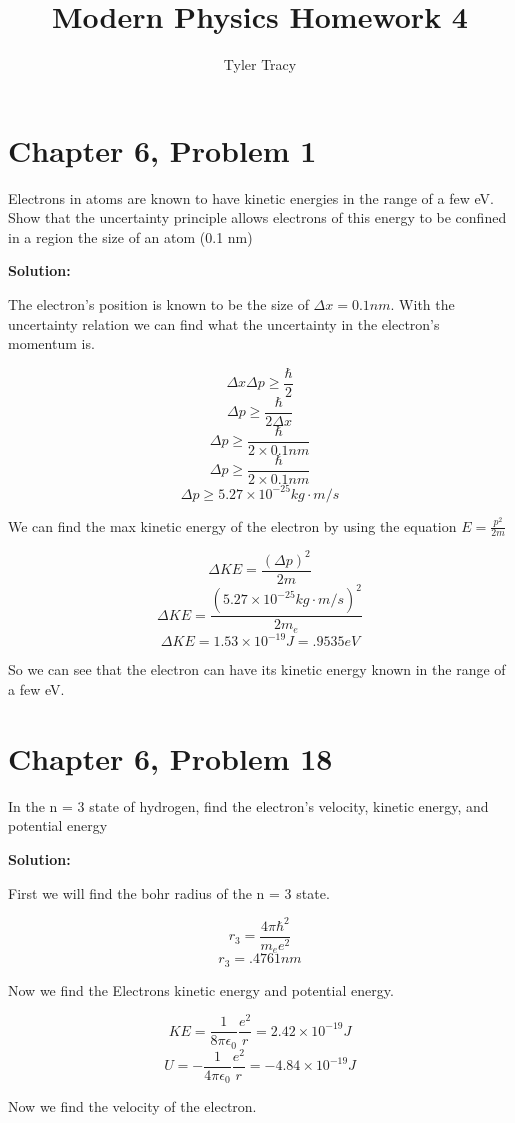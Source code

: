 \documentclass{article}
\title{Modern Physics Homework 4}
\author{Tyler Tracy}
\begin{document}
\maketitle


\section{Chapter 6, Problem 1}

Electrons in atoms are known to have kinetic energies in the range of a few eV. Show that the uncertainty principle allows electrons of this energy to be confined in a region the size of an atom (0.1 nm)


\textbf{Solution:}

The electron's position is known to be the size of $ \Delta x = 0.1 nm $. With the uncertainty relation we can find what the uncertainty in the electron's momentum is.

$$\Delta x \Delta p \geq \frac{\hbar}{2}$$
$$ \Delta p \geq \frac{\hbar}{2 \Delta x}$$
$$ \Delta p \geq \frac{\hbar}{2 \times 0.1 nm}$$
$$ \Delta p \geq \frac{\hbar}{2 \times 0.1 nm}$$
$$ \Delta p \geq 5.27 \times 10^{-25} kg \cdot m/s$$

We can find the max kinetic energy of the electron by using the equation $E = \frac{p^2}{2m}$

$$\Delta KE = \frac{(\Delta p)^2}{2m}$$
$$\Delta KE = \frac{(5.27 \times 10^{-25} kg \cdot m/s)^2}{2m_e}$$
$$\Delta KE = 1.53 \times 10^{-19} J = .9535 eV$$

So we can see that the electron can have its kinetic energy known in the range of a few eV.


\section{Chapter 6, Problem 18}
In the n = 3 state of hydrogen, find the electron’s velocity, kinetic energy, and potential energy

\textbf{Solution:}

First we will find the bohr radius of the n = 3 state.

$$r_{3} = \frac{4\pi \hbar^2}{m_e e^2}$$
$$r_{3} = .4761nm $$

Now we find the Electrons kinetic energy and potential energy.

$$KE = \frac{1}{8 \pi \epsilon_0} \frac{e^2}{r} = 2.42 \times 10^{-19} J $$
$$U = -\frac{1}{4 \pi \epsilon_0} \frac{e^2}{r} = -4.84 \times 10^{-19} J $$

Now we find the velocity of the electron.
\end{document}
